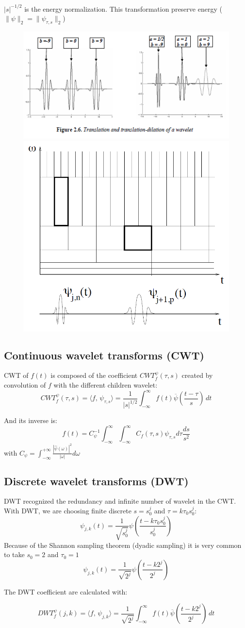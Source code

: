 \documentclass[twocolumn]{article}
\numberwithin{equation}{section}
\begin{document}
$|s|^{-1/2}$ is the energy normalization. This transformation preserve energy ($\|\psi\|_2=\|\psi _{\tau,s}\|_2$)
\begin{figure}[H]
\centering
    \includegraphics[width=.40\textwidth]{img27.png}
    \includegraphics[width=.20\textwidth]{mallat2.png}
\end{figure}

		\subsection{Continuous wavelet transforms (CWT)}
CWT of $f(t)$ is composed of the coefficient $CWT_f^\psi(\tau,s)$ created by convolution of $f$ with the different children wavelet:
$$\boxed{CWT_f^\psi(\tau,s)=\langle f,\,\psi_{\tau,s}\rangle=\frac{1}{|s|^{1/2}} \int_{-\infty}^{\infty} f(t)\overline\psi\left(\frac{t-\tau}{s}\right)\, dt}$$

And its inverse is:
$$f(t)=C_\psi^{-1}\int_{-\infty}^{\infty}\int_{-\infty}^{\infty} C_f(\tau,s)\psi _{\tau,s} d\tau \frac{ds}{s^2}$$
with $C_\psi = \int_{-\infty}^{+\infty}
  \frac{\left| \hat{\psi}(\omega) \right|^2}{\left| \omega \right|} d\omega$
  
		\subsection{Discrete wavelet transforms (DWT)}
DWT recognized the redundancy and infinite number of wavelet in the CWT. With DWT, we are choosing finite discrete $s=s_0^j$ and $\tau=k\tau_0 s_0^j$:
$$\psi_{j,k}(t)=\frac{1}{\sqrt{s_0^{j}}} \psi\left(\frac{t-k\tau_0 s_0^j}{s_0^j}\right)$$
Because of the Shannon sampling theorem (dyadic sampling) it is very common to take $s_0=2$ and $\tau_0=1$
$$\psi_{j,k}(t)=\frac{1}{\sqrt{2^{j}}} \psi\left(\frac{t-k 2^j}{2^j}\right)$$

The DWT coefficient are calculated with:

$$\boxed{DWT_f^{\psi}(j,k)=\langle f,\,\psi_{j,k}\rangle=\frac{1}{\sqrt{2^{j}}}  \int_{-\infty}^{\infty} f(t)\overline\psi\left(\frac{t-k 2^j}{2^j}\right)\, dt}$$
\end{document}
